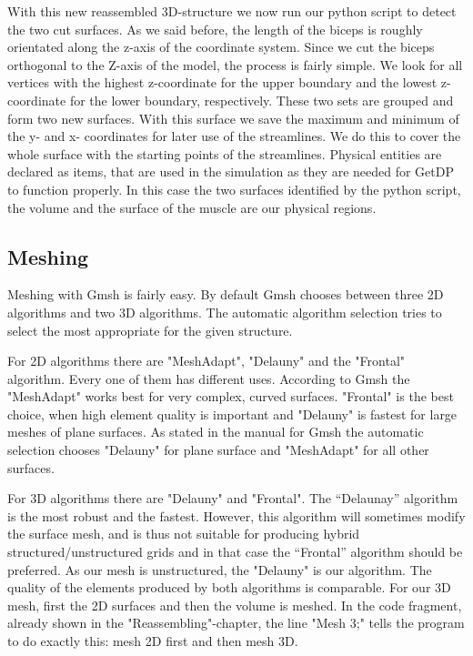 \documentclass[preprint,journal]{vgtc}       %
\begin{document}
With this new reassembled 3D-structure we now run our python script to detect the two cut surfaces.
As we said before, the length of the biceps is roughly orientated along the z-axis of the coordinate system. 
Since we cut the biceps orthogonal to the Z-axis of the model, the process is fairly simple.
We look for all vertices with the highest z-coordinate for the upper boundary and the lowest z-coordinate for the lower boundary, respectively.
These two sets are grouped and form two new surfaces. 
With this surface we save the maximum and minimum of the y- and x- coordinates for later use of the streamlines. 
We do this to cover the whole surface with the starting points of the streamlines.
Physical entities are declared as items, that are used in the simulation as they are needed for GetDP to function properly.
In this case the two surfaces identified by the python script, the volume and the surface of the muscle are our physical regions. 

\subsection{Meshing}
Meshing with Gmsh is fairly easy. 
By default Gmsh chooses between three 2D algorithms and two 3D algorithms.
The automatic algorithm selection tries to select the most appropriate for the given structure.

For 2D algorithms there are "MeshAdapt", "Delauny" and the "Frontal" algorithm.
Every one of them has different uses. 
According to Gmsh the "MeshAdapt" works best for very complex, curved surfaces.
"Frontal" is the best choice, when high element quality is important and "Delauny" is fastest for large meshes of plane surfaces.
As stated in the manual for Gmsh the automatic selection chooses "Delauny" for plane surface and "MeshAdapt" for all other surfaces. 

For 3D algorithms there are "Delauny" and "Frontal". 
The “Delaunay” algorithm is the most robust and the fastest. 
However, this algorithm will sometimes modify the surface mesh, and is thus not suitable for producing hybrid structured/unstructured grids and in that case the “Frontal” algorithm should be preferred. 
As our mesh is unstructured, the "Delauny" is our algorithm. 
The quality of the elements produced by both algorithms is comparable.
For our 3D mesh, first the 2D surfaces and then the volume is meshed. 
In the code fragment, already shown in the "Reassembling"-chapter, the line "Mesh 3;" tells the program to do exactly this: mesh 2D first and then mesh 3D.
%	
\end{document}
